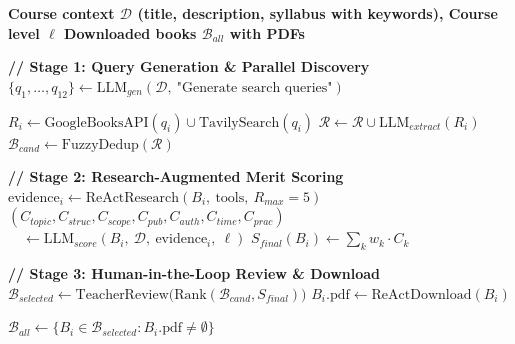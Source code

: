 \begin{algorithm}
\caption{\textbf{Phase 0: Agentic Book Discovery, Scoring \& Acquisition}}
\begin{algorithmic}[1]
\bfseries
\Require Course context $\mathcal{D}$ (title, description, syllabus with keywords), Course level $\ell$
\Ensure Downloaded books $\mathcal{B}_{all}$ with PDFs

\State \textbf{// Stage 1: Query Generation \& Parallel Discovery}
\State $\{q_1, \dots, q_{12}\} \leftarrow \text{LLM}_{gen}(\mathcal{D},\ \text{"Generate search queries"})$

    \State $R_i \leftarrow \text{GoogleBooksAPI}(q_i) \cup \text{TavilySearch}(q_i)$
    \State $\mathcal{R} \leftarrow \mathcal{R} \cup \text{LLM}_{extract}(R_i)$
\EndFor
\State $\mathcal{B}_{cand} \leftarrow \text{FuzzyDedup}(\mathcal{R})$

\State
\State \textbf{// Stage 2: Research-Augmented Merit Scoring}
    \State $\text{evidence}_i \leftarrow \text{ReActResearch}(B_i,\ \text{tools},\ R_{max}{=}5)$
    \State $(C_{topic}, C_{struc}, C_{scope}, C_{pub}, C_{auth}, C_{time}, C_{prac})$
    \State $\quad \leftarrow \text{LLM}_{score}(B_i,\ \mathcal{D},\ \text{evidence}_i,\ \ell)$
    \State $S_{final}(B_i) \leftarrow \sum_{k} w_k \cdot C_k$
\EndFor

\State
\State \textbf{// Stage 3: Human-in-the-Loop Review \& Download}
\State $\mathcal{B}_{selected} \leftarrow \text{TeacherReview}\bigl(\text{Rank}(\mathcal{B}_{cand}, S_{final})\bigr)$
    \State $B_i.\text{pdf} \leftarrow \text{ReActDownload}(B_i)$
\EndFor

\State \Return $\mathcal{B}_{all} \leftarrow \{B_i \in \mathcal{B}_{selected} : B_i.\text{pdf} \neq \emptyset\}$
\end{algorithmic}
\end{algorithm}


